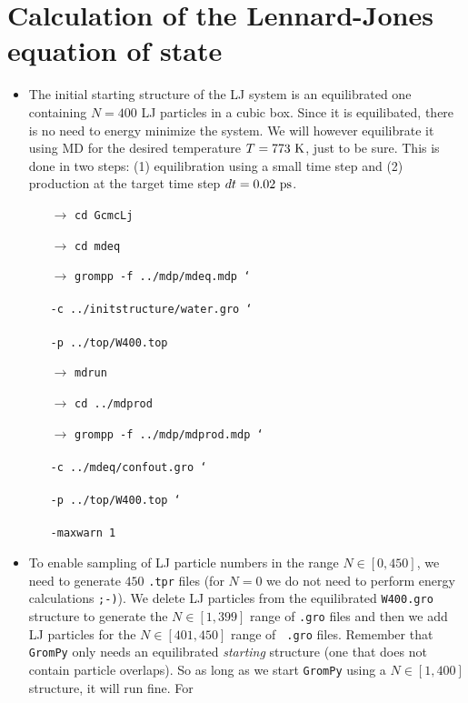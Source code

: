 \documentclass[fleqn,a4paper,12pt]{article}
\begin{document}
\section{Calculation of the Lennard-Jones equation of state}
\begin{itemize}
  	\item The initial starting structure of the LJ system is an equilibrated one
  	containing $N=400$ LJ particles in a cubic box. Since it is equilibated,
  	there is no need to energy minimize the system. We will however equilibrate it using
  	MD for the desired temperature $T=773~\rm K$, just to be sure. This is done
  	in two steps: (1) equilibration using a small time step and (2) production at
  	the target time step $dt=0.02~\rm ps$.
  	\begin{itemize}
  		\item[$\to$] {\tt cd GcmcLj}
  		\item[$\to$] {\tt cd mdeq}
  		\item[$\to$] {\tt grompp -f ../mdp/mdeq.mdp \char`\\}\\
  					 {\tt -c ../initstructure/water.gro \char`\\}\\
  					 {\tt -p ../top/W400.top}
  		\item[$\to$] {\tt mdrun}
  		\item[$\to$] {\tt cd ../mdprod}
  		\item[$\to$] {\tt grompp -f ../mdp/mdprod.mdp \char`\\}\\
  					 {\tt -c ../mdeq/confout.gro \char`\\}\\
  					 {\tt -p ../top/W400.top \char`\\}\\
  					 {\tt -maxwarn 1}
  	\end{itemize}
  	\item To enable sampling of LJ particle numbers in the range $N\in [0,450]$,
  	we need to generate $450$ {\tt .tpr} files (for $N=0$ we do not need to
  	perform energy calculations {\tt ;-)}). We delete LJ particles from the equilibrated
  	{\tt W400.gro} structure to generate the $N\in [1,399]$ range of {\tt .gro}
  	files and then we add LJ particles for the $N\in [401,450]$ range of {\tt
  	.gro} files. Remember that {\tt GromPy} only needs an equilibrated
  	{\em starting} structure (one that does not contain particle overlaps). So as
  	long as we start {\tt GromPy} using a $N\in [1,400]$ structure, it will run fine. For

\end{itemize}
\end{document}
